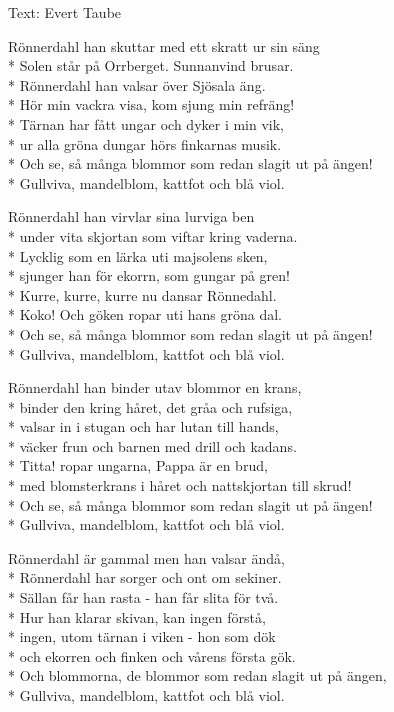 \begin{SongText}
\begin{SongInfo}
    Text: Evert Taube
\end{SongInfo}
\begin{SongVerse}
Rönnerdahl han skuttar med ett skratt ur sin säng\\*%
Solen står på Orrberget. Sunnanvind brusar.\\*%
Rönnerdahl han valsar över Sjösala äng.\\*%
Hör min vackra visa, kom sjung min refräng!\\*%
Tärnan har fått ungar och dyker i min vik,\\*%
ur alla gröna dungar hörs finkarnas musik.\\*%
Och se, så många blommor som redan slagit ut på ängen!\\*%
Gullviva, mandelblom, kattfot och blå viol.
\end{SongVerse}
\begin{SongVerse}
Rönnerdahl han virvlar sina lurviga ben\\*%
under vita skjortan som viftar kring vaderna.\\*%
Lycklig som en lärka uti majsolens sken,\\*%
sjunger han för ekorrn, som gungar på gren!\\*%
Kurre, kurre, kurre nu dansar Rönnedahl.\\*%
Koko! Och göken ropar uti hans gröna dal.\\*%
Och se, så många blommor som redan slagit ut på ängen!\\*%
Gullviva, mandelblom, kattfot och blå viol. 
\end{SongVerse}
\begin{SongVerse}
Rönnerdahl han binder utav blommor en krans,\\*%
binder den kring håret, det gråa och rufsiga,\\*%
valsar in i stugan och har lutan till hands,\\*%
väcker frun och barnen med drill och kadans.\\*%
Titta! ropar ungarna, Pappa är en brud,\\*%
med blomsterkrans i håret och nattskjortan till skrud!\\*%
Och se, så många blommor som redan slagit ut på ängen!\\*%
Gullviva, mandelblom, kattfot och blå viol.
\end{SongVerse}
\begin{SongVerse}
Rönnerdahl är gammal men han valsar ändå,\\*%
Rönnerdahl har sorger och ont om sekiner.\\*%
Sällan får han rasta - han får slita för två.\\*%
Hur han klarar skivan, kan ingen förstå,\\*%
ingen, utom tärnan i viken - hon som dök\\*%
och ekorren och finken och vårens första gök.\\*%
Och blommorna, de blommor som redan slagit ut på ängen,\\*%
Gullviva, mandelblom, kattfot och blå viol. 
\end{SongVerse}
\end{SongText}
